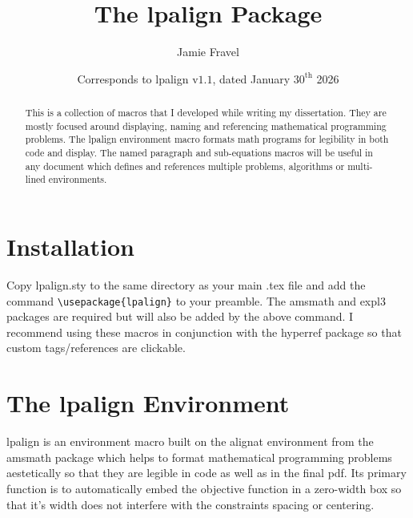 \documentclass{article}
\title{The \textsf{lpalign} Package}
\date{Corresponds to \textsf{lpalign} v$1.1$, dated January $30^\textrm{th}$ 2026}
\author{Jamie Fravel}
\affil{jamiefravel@me.com}
\begin{document}
\maketitle
\begin{abstract}
    This is a collection of macros that I developed while writing my dissertation. They are mostly focused around displaying, naming and referencing mathematical programming problems. The \textsf{lpalign} environment macro formats math programs for legibility in both code and display. The named paragraph and  sub-equations macros will be useful in any document which defines and references multiple problems, algorithms or multi-lined environments. 
\end{abstract}

\tableofcontents

\section{Installation}

Copy \textsf{lpalign.sty} to the same directory as your main \textsf{.tex} file and add the command \verb|\usepackage{lpalign}| to your preamble. The \textsf{amsmath} and  \textsf{expl3} packages are required but will also be added by the above command. I recommend using these macros in conjunction with the \textsf{hyperref} package so that custom tags/references are clickable.




\section{The \textsf{lpalign} Environment}

\textsf{lpalign} is an environment macro built on the \textsf{alignat} environment from the \textsf{amsmath} package which helps to format mathematical programming problems aestetically so that they are legible in code as well as in the final pdf. Its primary function is to automatically embed the objective function in a zero-width box so that it's width does not interfere with the constraints spacing or centering.
\end{document}
